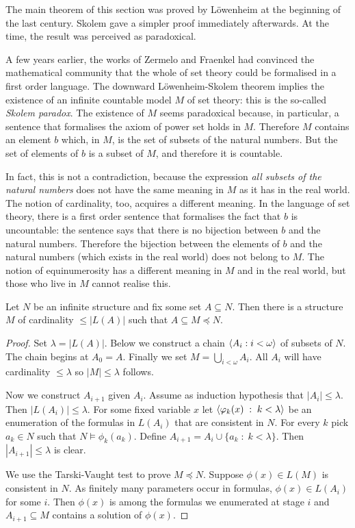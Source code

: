 \documentclass[creche.tex]{subfiles}
\begin{document}
The main theorem of this section was proved by L\"owenheim at the beginning of the last century.
Skolem gave a simpler proof immediately afterwards.
At the time, the result was perceived as paradoxical.

A few years earlier, the works of Zermelo and Fraenkel had convinced the mathematical community that the whole of set theory could be formalised in a first order language.
The downward L\"owenheim-Skolem theorem implies the existence of an infinite countable model $M$ of set theory: this is the so-called  \emph{Skolem paradox}.
The existence of  $M$ seems paradoxical because, in particular, a sentence that formalises the axiom of power set holds in $M$.
Therefore $M$ contains an element $b$ which, in $M$, is the set of subsets of the natural numbers.
But the set of elements of $b$ is a subset of $M$, and therefore it is countable.

In fact, this is not a contradiction, because the expression \textit{all subsets of the natural numbers\/} does not have the same meaning in $M$ as it has in the real world.
The notion of cardinality, too, acquires a different meaning.
In the language of set theory, there is a first order sentence that formalises the fact that $b$ is uncountable: the sentence says that there is no bijection between $b$ and the natural numbers.
Therefore the bijection between the elements of $b$ and the natural numbers (which exists in the real world) does not belong to $M$.
The notion of equinumerosity has a different meaning in $M$ and in the real world, but those who live in $M$ cannot realise this.

\begin{void_thm}\label{lowenheimskolemallingiu}
Let $N$ be an infinite structure and fix some set $A\subseteq N$.
Then there is a structure $M$ of cardinality $\le|L(A)|$ such that $A\subseteq M\preceq N$.

\end{void_thm}

\begin{proof}
Set $\lambda=|L(A)|$.
Below we construct a chain $\langle A_i:i<\omega\rangle$ of subsets of $N$.
The chain begins at $A_0=A$.
Finally we set $M=\bigcup_{i<\omega}A_i$.
All $A_i$ will have cardinality $\le\lambda$ so  $|M|\le\lambda$ follows.

Now we construct $A_{i+1}$ given $A_i$.
Assume as induction hypothesis that $|A_i|\le\lambda$.
Then $|L(A_i)|\le\lambda$.
For some fixed variable $x$ let $\langle\varphi_k(x)\;:\;k<\lambda\rangle$ be an enumeration of the formulas in $L(A_i)$ that are consistent in $N$.
For every $k$ pick $a_k\in N$ such that $N\models\phi_k(a_k)$.
 Define $A_{i+1}=A_i\cup\{a_k\;:\;k<\lambda\}$.
Then $|A_{i+1}|\le\lambda$ is clear.

We use the Tarski-Vaught test to prove $M\preceq N$.
Suppose $\phi(x)\in L(M)$ is consistent in $N$.
As finitely many parameters occur in formulas, $\phi(x)\in L(A_i)$ for some $i$.
Then $\phi(x)$ is among the formulas we enumerated at stage $i$ and $A_{i+1}\subseteq M$ contains a solution of $\phi(x)$.
\end{proof}
\end{document}
